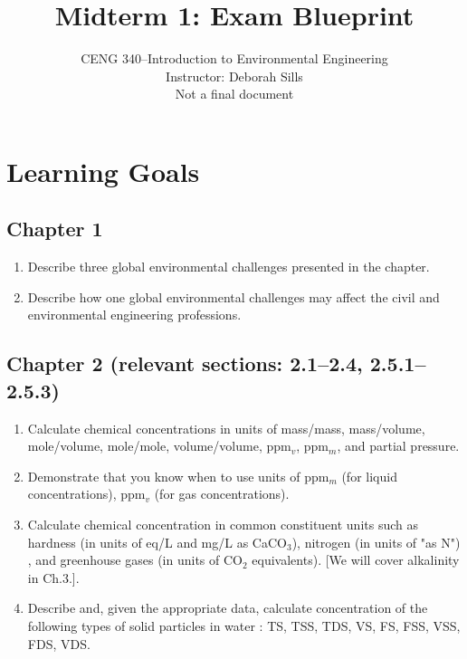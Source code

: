 \documentclass[12pt,letterpaper]{article}
\begin{document}
\setlength{\parindent}{0cm} 


\frenchspacing

\title {Midterm 1: Exam Blueprint} 
\author {CENG 340--Introduction to Environmental Engineering\\
Instructor: Deborah Sills\\Not a final document}
 
\maketitle



\section *{Learning Goals}
\subsection *{Chapter 1}
\begin{enumerate}
\item Describe three global environmental challenges presented in the chapter.
\item Describe how one global environmental challenges may affect the civil and environmental engineering professions.


\end{enumerate}

\subsection *{Chapter 2 (relevant sections: 2.1--2.4, 2.5.1--2.5.3)}
\begin{enumerate}
\item Calculate chemical concentrations in units of mass/mass, mass/volume, mole/volume, mole/mole, volume/volume, ppm$_v$, ppm$_m$, and partial pressure.
\item Demonstrate that you know when to use units of ppm$_m$ (for liquid concentrations), ppm$_v$ (for gas concentrations).
\item Calculate chemical concentration in common constituent units such as hardness (in units of eq/L and mg/L as CaCO$_3$), nitrogen (in units of "as N") , and greenhouse gases (in units of CO$_2$ equivalents). [We will cover alkalinity in Ch.3.].
\item Describe and, given the appropriate data, calculate concentration of the following types of solid particles in water : TS, TSS, TDS, VS, FS, FSS, VSS, FDS, VDS.
\end{enumerate}
\end{document}
